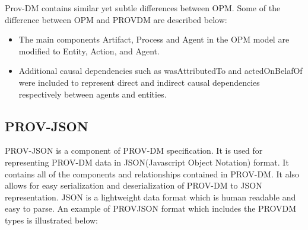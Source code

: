Prov-DM contains similar yet subtle differences between OPM. Some of the difference between OPM and PROV\-DM are described below:

\begin{itemize}

\item The main components Artifact, Process and Agent in the OPM model are modified to Entity, Action, and Agent. 

\item Additional causal dependencies such as wasAttributedTo and actedOnBelafOf were included to represent direct and indirect causal dependencies respectively between agents and entities.

\end{itemize}


\subsection{PROV-JSON}

PROV-JSON is a component of PROV-DM specification. It is used for representing PROV-DM data in JSON(Javascript Object Notation) format. It contains all of the components and relationships contained in PROV-DM. It also allows for easy serialization and deserialization of PROV-DM to JSON representation. JSON is a lightweight data format which is human readable and easy to parse. An example of PROV\-JSON format which includes the PROV\-DM types is illustrated below:

